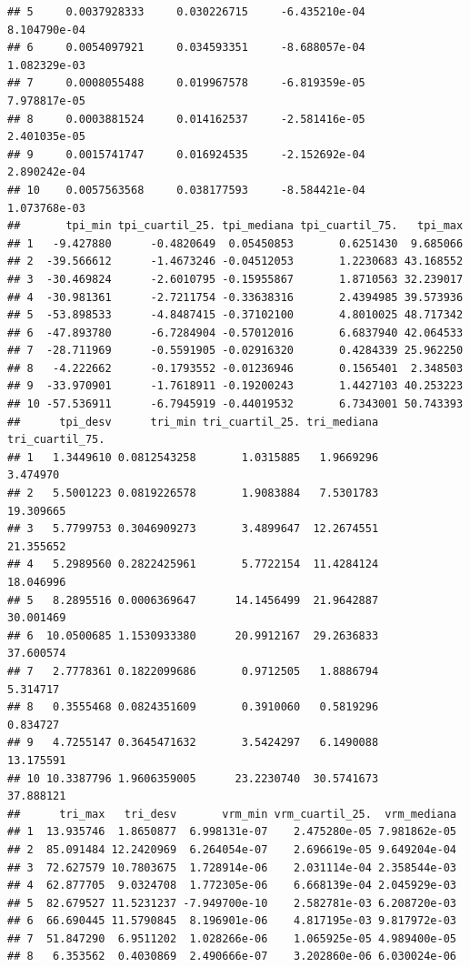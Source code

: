 \documentclass[11pt,]{article}
\begin{document}
\begin{verbatim}
## 5     0.0037928333     0.030226715     -6.435210e-04      8.104790e-04
## 6     0.0054097921     0.034593351     -8.688057e-04      1.082329e-03
## 7     0.0008055488     0.019967578     -6.819359e-05      7.978817e-05
## 8     0.0003881524     0.014162537     -2.581416e-05      2.401035e-05
## 9     0.0015741747     0.016924535     -2.152692e-04      2.890242e-04
## 10    0.0057563568     0.038177593     -8.584421e-04      1.073768e-03
##       tpi_min tpi_cuartil_25. tpi_mediana tpi_cuartil_75.   tpi_max
## 1   -9.427880      -0.4820649  0.05450853       0.6251430  9.685066
## 2  -39.566612      -1.4673246 -0.04512053       1.2230683 43.168552
## 3  -30.469824      -2.6010795 -0.15955867       1.8710563 32.239017
## 4  -30.981361      -2.7211754 -0.33638316       2.4394985 39.573936
## 5  -53.898533      -4.8487415 -0.37102100       4.8010025 48.717342
## 6  -47.893780      -6.7284904 -0.57012016       6.6837940 42.064533
## 7  -28.711969      -0.5591905 -0.02916320       0.4284339 25.962250
## 8   -4.222662      -0.1793552 -0.01236946       0.1565401  2.348503
## 9  -33.970901      -1.7618911 -0.19200243       1.4427103 40.253223
## 10 -57.536911      -6.7945919 -0.44019532       6.7343001 50.743393
##      tpi_desv      tri_min tri_cuartil_25. tri_mediana tri_cuartil_75.
## 1   1.3449610 0.0812543258       1.0315885   1.9669296        3.474970
## 2   5.5001223 0.0819226578       1.9083884   7.5301783       19.309665
## 3   5.7799753 0.3046909273       3.4899647  12.2674551       21.355652
## 4   5.2989560 0.2822425961       5.7722154  11.4284124       18.046996
## 5   8.2895516 0.0006369647      14.1456499  21.9642887       30.001469
## 6  10.0500685 1.1530933380      20.9912167  29.2636833       37.600574
## 7   2.7778361 0.1822099686       0.9712505   1.8886794        5.314717
## 8   0.3555468 0.0824351609       0.3910060   0.5819296        0.834727
## 9   4.7255147 0.3645471632       3.5424297   6.1490088       13.175591
## 10 10.3387796 1.9606359005      23.2230740  30.5741673       37.888121
##      tri_max   tri_desv       vrm_min vrm_cuartil_25.  vrm_mediana
## 1  13.935746  1.8650877  6.998131e-07    2.475280e-05 7.981862e-05
## 2  85.091484 12.2420969  6.264054e-07    2.696619e-05 9.649204e-04
## 3  72.627579 10.7803675  1.728914e-06    2.031114e-04 2.358544e-03
## 4  62.877705  9.0324708  1.772305e-06    6.668139e-04 2.045929e-03
## 5  82.679527 11.5231237 -7.949700e-10    2.582781e-03 6.208720e-03
## 6  66.690445 11.5790845  8.196901e-06    4.817195e-03 9.817972e-03
## 7  51.847290  6.9511202  1.028266e-06    1.065925e-05 4.989400e-05
## 8   6.353562  0.4030869  2.490666e-07    3.202860e-06 6.030024e-06

\end{verbatim}
\end{document}
